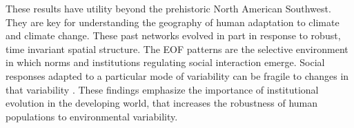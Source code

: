 \documentclass[10pt]{iopart}
\begin{document}
These results have utility beyond the prehistoric North American Southwest. They are key for understanding the geography of human adaptation to climate and climate change. These past networks evolved in part in response to robust, time invariant spatial structure. The EOF patterns are the selective environment in which norms and institutions regulating social interaction emerge. Social responses adapted to a particular mode of variability can be fragile to changes in that variability \parencite{Janssen2007}. These findings emphasize the importance of institutional evolution in the developing world, that increases the robustness of human populations to environmental variability.



















\printbibliography
\end{document}

